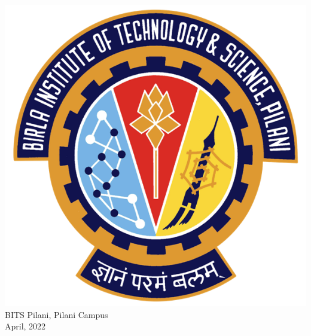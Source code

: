\documentclass[paper.tex]{subfiles}
\begin{document}
\begin{titlepage}
\begin{center}
            \includegraphics[scale=1.2]{images/bits_logo.png} %
            \\[1.5cm]
            BITS Pilani, Pilani Campus\\[0.1cm]
            {\large April, 2022}\\[4cm] %
            \vfill
        \end{center}
        
    \end{titlepage}
\end{document}
